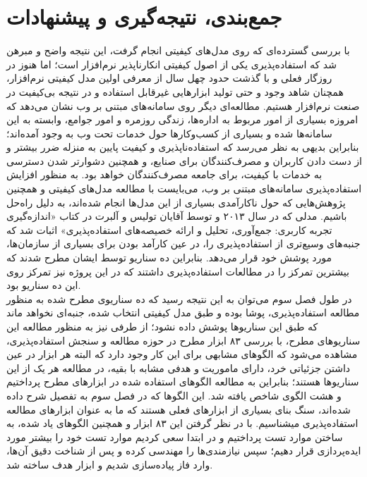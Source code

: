 \chapter{جمع‌بندی، نتیجه‌گیری و پیشنهادات}
با بررسی گسترده‌ای که روی مدل‌های کیفیتی انجام گرفت، این نتیجه واضح و مبرهن شد که استفاده‌پذیری یکی از اصول کیفیتی انکارناپذیر نرم‌افزار است؛ اما هنوز در روزگار فعلی و با گذشت حدود چهل سال از معرفی اولین مدل کیفیتی نرم‌افزار، همچنان شاهد وجود و حتی تولید ابزارهایی غیرقابل استفاده و در نتیجه بی‌کیفیت در صنعت نرم‌افزار هستیم. مطالعه‌ای دیگر روی سامانه‌های مبتنی بر وب نشان می‌دهد که امروزه بسیاری از امور مربوط به اداره‌ها، زندگی روزمره و امور جوامع، وابسته به این سامانه‌ها شده و بسیاری از کسب‌وکارها حول خدمات تحت وب به وجود آمده‌اند؛ بنابراین بدیهی به نظر می‌رسد که استفاده‌ناپذیری و کیفیت پایین به منزله ضرر بیشتر و از دست دادن کاربران و مصرف‌کنندگان برای صنایع، و همچنین دشوارتر شدن دسترسی به خدمات با کیفیت، برای جامعه مصرف‌کنندگان خواهد بود. به منظور افزایش استفاده‌پذیری سامانه‌های مبتنی بر وب، می‌بایست با مطالعه مدل‌های کیفیتی و همچنین پژوهش‌هایی که حول ناکارآمدی بسیاری از این مدل‌ها انجام شده‌اند، به دلیل راه‌حل باشیم. مدلی که در سال ۲۰۱۳ و توسط آقایان تولیس و آلبرت در کتاب «اندازه‌گیری تجربه کاربری: جمع‌آوری، تحلیل و ارائه خصیصه‌های استفاده‌پذیری»
\cite{albert_measuring_2013}
اثبات شد که جنبه‌های وسیع‌تری از استفاده‌پذیری را، در عین کارآمد بودن برای بسیاری از سازمان‌ها، مورد پوشش خود قرار می‌دهد. بنابراین ده سناریو توسط ایشان مطرح شدند که بیشترین تمرکز را در مطالعات استفاده‌پذیری داشتند که در این پروژه نیز تمرکز روی این ده سناریو بود.\\
در طول فصل سوم می‌توان به این نتیجه رسید که ده سناریوی مطرح شده به منظور مطالعه استفاده‌پذیری، پوشا بوده و طبق مدل کیفیتی انتخاب شده، جنبه‌ای نخواهد ماند که طبق این سناریوها پوشش داده نشود؛ از طرفی نیز به منظور مطالعه این سناریوهای مطرح، با بررسی ۸۳ ابزار مطرح در حوزه مطالعه و سنجش استفاده‌پذیری، مشاهده می‌شود که الگوهای مشابهی برای این کار وجود دارد که البته هر ابزار در عین داشتن جزئیاتی خرد، دارای ماموریت و هدفی مشابه با بقیه‌، در مطالعه هر یک از این سناریوها هستند؛ بنابراین به مطالعه الگوهای استفاده شده در ابزارهای مطرح پرداختیم و هشت الگوی شاخص
یافته شد. این الگوها که در فصل سوم به تفصیل شرح داده شده‌اند، سنگ بنای بسیاری از ابزارهای فعلی هستند که ما به عنوان ابزارهای مطالعه استفاده‌پذیری میشناسیم. با در نظر گرفتن این ۸۳ ابزار و همچنین الگوهای یاد شده، به ساختن موارد تست پرداختیم و در ابتدا سعی کردیم موارد تست خود را بیشتر مورد ایده‌پردازی قرار دهیم؛ سپس نیازمندی‌ها را مهندسی کرده و پس از شناخت دقیق آن‌ها، وارد فاز پیاده‌سازی شدیم و ابزار هدف ساخته شد.
